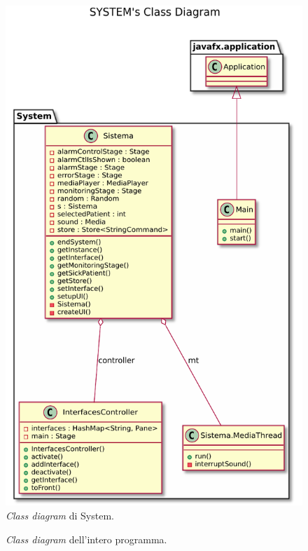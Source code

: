 \documentclass[final, smallexted]{svjour3}
\begin{document}
\begin{figure}
	\begin{center}
		\includegraphics[scale=1]{ClassDiagramImages/System.pdf}
		\caption{\textit{Class diagram} di System.}\label{systemclassdiagram}
	\end{center}
		
\end{figure}


\begin{landscape}
\begin{figure}
	\caption{\textit{Class diagram} dell'intero programma.}\label{totalclassdiagram}
\end{figure}
\end{landscape}
\end{document}

